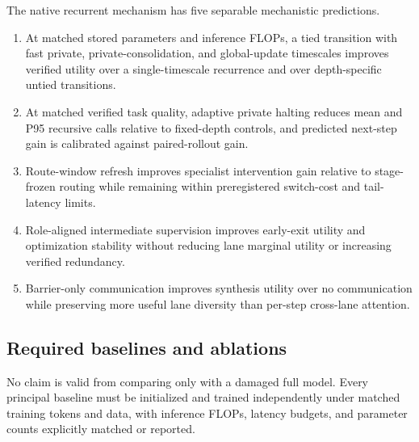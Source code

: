 \documentclass[10pt,a4paper]{article}
\begin{document}
The native recurrent mechanism has five separable mechanistic predictions.

\begin{enumerate}[label=\textbf{M\arabic*.},leftmargin=2.8em]
\item At matched stored parameters and inference FLOPs, a tied transition with
  fast private, private-consolidation, and global-update timescales improves
  verified utility over a single-timescale recurrence and over depth-specific
  untied transitions.
\item At matched verified task quality, adaptive private halting reduces mean
  and P95 recursive calls relative to fixed-depth controls, and predicted
  next-step gain is calibrated against paired-rollout gain.
\item Route-window refresh improves specialist intervention gain relative to
  stage-frozen routing while remaining within preregistered switch-cost and
  tail-latency limits.
\item Role-aligned intermediate supervision improves early-exit utility and
  optimization stability without reducing lane marginal utility or increasing
  verified redundancy.
\item Barrier-only communication improves synthesis utility over no
  communication while preserving more useful lane diversity than per-step
  cross-lane attention.
\end{enumerate}

\subsection{Required baselines and ablations}

No claim is valid from comparing only with a damaged full model. Every
principal baseline must be initialized and trained independently under matched
training tokens and data, with inference FLOPs, latency budgets, and parameter
counts explicitly matched or reported.
\end{document}
